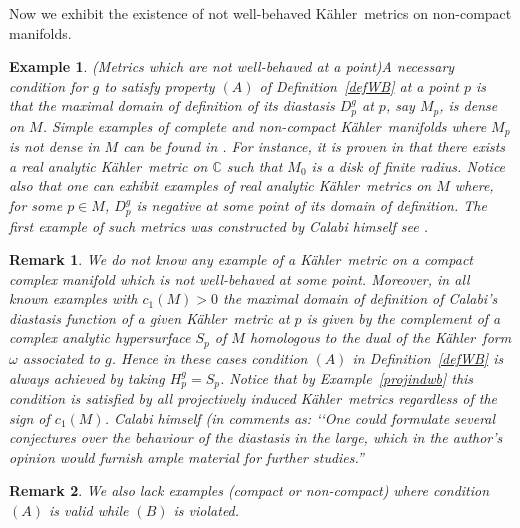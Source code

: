 \documentclass[12pt]{amsart}
\newcommand{\C}{\mathbb{C}}
\newcommand{\K}{K\"{a}hler}
\newtheorem{ex}{Example}
\newtheorem{remark}{Remark}
\begin{document}
Now  we exhibit the existence of not well-behaved \K\ metrics on non-compact manifolds.


\begin{ex}\rm(Metrics which are not well-behaved at a point)\label{exnotwbnoncomp} 
	A necessary condition for $g$ to satisfy property $(A)$ of Definition~\ref{defWB} at a point $p$ is that the   maximal domain of definition of its  diastasis $D^g_p$ at $p$, say $M_p$, is  dense on $M$. Simple examples of complete and   non-compact \K\ manifolds 
	where $M_p$ is not dense in $M$  can be found  in \cite[Theorem~1]{Suzuki82ContinuationDiastasis}.
	For instance, it is proven in  \cite{Suzuki82ContinuationDiastasis} that there exists a real analytic \K\ metric on $\C$ such that $M_0$ is a disk of finite radius. Notice also that one can exhibit examples of  real analytic \K\ metrics on $M$ where, for some $p\in M$, $D_p^g$ is negative at some point of its domain of definition. 
	The first example of such metrics was constructed by Calabi himself see   \cite[p.~23]{Calabi53Isometric}.
\end{ex}





\begin{remark}\rm\label{wbforever}
	We do not know any  example of  a   \K\ metric on a compact complex manifold which is not well-behaved at some point.  
	Moreover, in all known examples  with  $c_1(M)>0$ the maximal domain of definition of Calabi's diastasis function of a given \K\ metric at $p$
	is given by  the complement  of a complex analytic hypersurface $S_p$ of $M$ homologous to the dual of the \K\ form $\omega$ associated to $g$.
	Hence in these cases   condition $(A)$ in Definition~\ref{defWB} is always achieved by taking $H_p^g=S_p$.
	Notice that by Example~\ref{projindwb} this condition is satisfied  by all projectively induced  \K\ metrics regardless of the sign of $c_1(M)$.
	Calabi himself (in \cite[p.4]{Calabi53Isometric} 
	comments as: \lq\lq One could formulate several conjectures  over the behaviour of the diastasis in the large, which in the author's opinion would furnish ample material for further studies.''
\end{remark}



\begin{remark}\rm
	We also  lack examples  (compact or non-compact) where
	condition $(A)$ is valid  while   $(B)$ is violated.
\end{remark}
\end{document}
